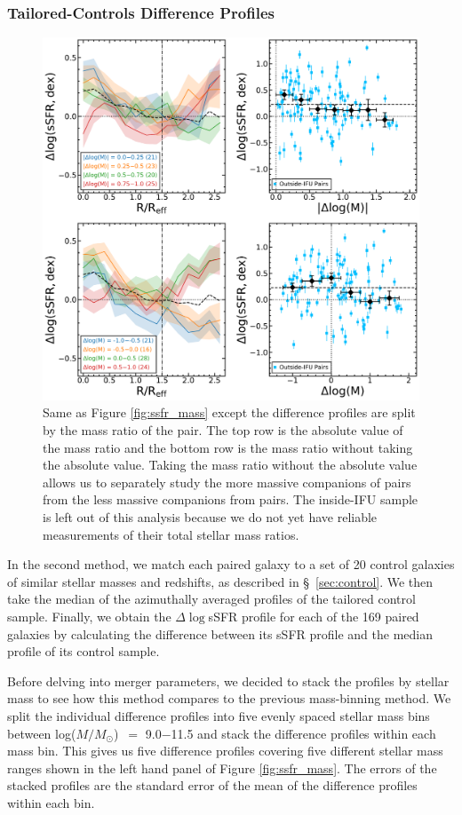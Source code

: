 \documentclass[apj,twocolumn]{emulateapj}
\newcommand{\logm}{log($M/M_{\odot}$)}
\begin{document}
\begin{CJK*}{UTF8}{gbsn}
\subsubsection{Tailored-Controls Difference Profiles}\label{sec:tailored}
\begin{figure}
\centering
\includegraphics[width=0.8\linewidth]{ssfr_dm.pdf}
\caption[]{Same as Figure \ref{fig:ssfr_mass} except the difference profiles are split by the mass ratio of the pair. The top row is the absolute value of the mass ratio and the bottom row is the mass ratio without taking the absolute value. Taking the mass ratio without the absolute value allows us to separately study the more massive companions of pairs from the less massive companions from pairs. The inside-IFU sample is left out of this analysis because we do not yet have reliable measurements of their total stellar mass ratios.}
\label{fig:ssfr_dm}
\end{figure}
In the second method, we match each paired galaxy to a set of 20 control galaxies of similar stellar masses and redshifts, as described in \S~\ref{sec:control}. We then take the median of the azimuthally averaged profiles of the tailored control sample. Finally, we obtain the $\Delta\log$sSFR profile for each of the 169 paired galaxies by calculating the difference between its sSFR profile and the median profile of its control sample.

Before delving into merger parameters, we decided to stack the profiles by stellar mass to see how this method compares to the previous mass-binning method. We split the individual difference profiles into five evenly spaced stellar mass bins between \logm\ $=$ 9.0$-$11.5 and stack the difference profiles within each mass bin. This gives us five difference profiles covering five different stellar mass ranges shown in the left hand panel of Figure \ref{fig:ssfr_mass}. The errors of the stacked profiles are the standard error of the mean of the difference profiles within each bin.


\end{CJK*}
\end{document}
